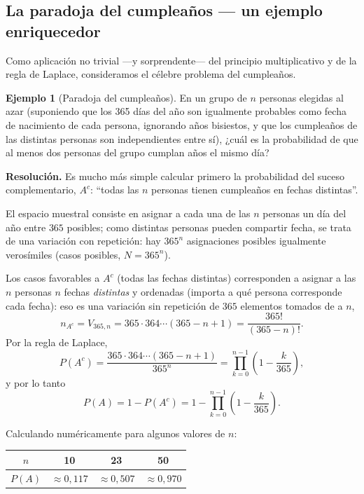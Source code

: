 \documentclass[11pt,a4paper]{article}
\theoremstyle{plain}
\theoremstyle{definition}
\newtheorem{ejemplo}[teorema]{Ejemplo}
\theoremstyle{remark}
\begin{document}
\subsection{La paradoja del cumpleaños — un ejemplo enriquecedor}

Como aplicación no trivial —y sorprendente— del principio multiplicativo y de la regla de Laplace, consideramos el célebre problema del cumpleaños.

\begin{ejemplo}[Paradoja del cumpleaños]
En un grupo de $n$ personas elegidas al azar (suponiendo que los 365 días del año son igualmente probables como fecha de nacimiento de cada persona, ignorando años bisiestos, y que los cumpleaños de las distintas personas son independientes entre sí), ¿cuál es la probabilidad de que al menos dos personas del grupo cumplan años el mismo día?
\end{ejemplo}

\textbf{Resolución.} Es mucho más simple calcular primero la probabilidad del suceso complementario, $A^c$: ``todas las $n$ personas tienen cumpleaños en fechas distintas''.

El espacio muestral consiste en asignar a cada una de las $n$ personas un día del año entre $365$ posibles; como distintas personas pueden compartir fecha, se trata de una variación con repetición: hay $365^n$ asignaciones posibles igualmente verosímiles (casos posibles, $N=365^n$).

Los casos favorables a $A^c$ (todas las fechas distintas) corresponden a asignar a las $n$ personas $n$ fechas \emph{distintas} y ordenadas (importa a qué persona corresponde cada fecha): eso es una variación sin repetición de $365$ elementos tomados de a $n$,
\[
n_{A^c} = V_{365,n} = 365\cdot 364 \cdots (365-n+1) = \frac{365!}{(365-n)!}.
\]
Por la regla de Laplace,
\[
P(A^c) = \frac{365\cdot 364 \cdots (365-n+1)}{365^n} = \prod_{k=0}^{n-1}\left(1-\frac{k}{365}\right),
\]
y por lo tanto
\[
P(A) = 1-P(A^c) = 1 - \prod_{k=0}^{n-1}\left(1-\frac{k}{365}\right).
\]

Calculando numéricamente para algunos valores de $n$:
\begin{center}
\begin{tabular}{@{}cccc@{}}
\toprule
$n$ & 10 & 23 & 50 \\
\midrule
$P(A)$ & $\approx 0{,}117$ & $\approx 0{,}507$ & $\approx 0{,}970$ \\
\bottomrule
\end{tabular}
\end{center}
\end{document}
